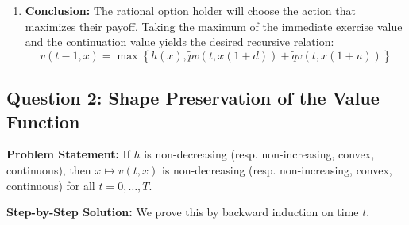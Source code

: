 \begin{enumerate}
    \item \textbf{Conclusion:} The rational option holder will choose the action that maximizes their payoff. Taking the maximum of the immediate exercise value and the continuation value yields the desired recursive relation:
    \begin{equation*}
        v(t-1,x) = \max\left\{ h(x), \tilde{p} v(t, x(1+d)) + \tilde{q} v(t, x(1+u)) \right\}
    \end{equation*}
\end{enumerate}


\subsection*{Question 2: Shape Preservation of the Value Function}

\textbf{Problem Statement:}
If $h$ is non-decreasing (resp. non-increasing, convex, continuous), then $x \mapsto v(t,x)$ is non-decreasing (resp. non-increasing, convex, continuous) for all $t=0,\dots,T$.

\textbf{Step-by-Step Solution:}
We prove this by backward induction on time $t$.

